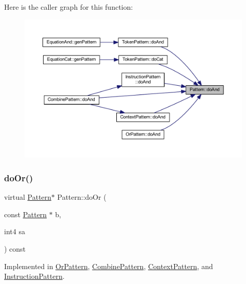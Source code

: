 Here is the caller graph for this function\+:
\nopagebreak
\begin{figure}[H]
\begin{center}
\leavevmode
\includegraphics[width=350pt]{class_pattern_a960f3e000e2642c452fe11f5b55a9589_icgraph}
\end{center}
\end{figure}
\mbox{\label{class_pattern_a130c23bfea1cb4a1c6e83edf9e2503d3}} 
\subsubsection{\texorpdfstring{doOr()}{doOr()}}
{\footnotesize\ttfamily virtual \mbox{\hyperlink{class_pattern}{Pattern}}$\ast$ Pattern\+::do\+Or (\begin{DoxyParamCaption}\item[{const \mbox{\hyperlink{class_pattern}{Pattern}} $\ast$}]{b,  }\item[{int4}]{sa }\end{DoxyParamCaption}) const\hspace{0.3cm}{\ttfamily [pure virtual]}}



Implemented in \mbox{\hyperlink{class_or_pattern_a969bd58751ab797ec77e4c0c74168410}{Or\+Pattern}}, \mbox{\hyperlink{class_combine_pattern_acc261bd115b31b7f004d5766702e5412}{Combine\+Pattern}}, \mbox{\hyperlink{class_context_pattern_aa80ff4baf1fae14a7e5cd744d1409620}{Context\+Pattern}}, and \mbox{\hyperlink{class_instruction_pattern_ae44ac91ca0f01f366cdd5e89d7fe0d06}{Instruction\+Pattern}}.

